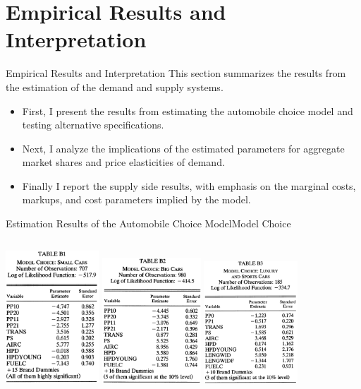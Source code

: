 \documentclass{beamer}
\begin{document}
\section{Empirical Results and Interpretation}
\begin{frame}[shrink]
	\transfade %
	\tableofcontents[sectionstyle=show/shaded,subsectionstyle=show/shaded/hide]
	\addtocounter{framenumber}{-1}
\end{frame}
\begin{frame}{Empirical Results and Interpretation}
	This section summarizes the results from the estimation of the demand and supply systems.
	\begin{itemize}
		\item First, I present the results from estimating the automobile choice model and testing alternative specifications.
		\item Next, I analyze the implications of the estimated parameters for aggregate market shares and price elasticities of demand.
		\item Finally I report the supply side results, with emphasis on the marginal costs, markups, and cost parameters implied by the model.
	\end{itemize}
\end{frame}
\begin{frame}{Estimation Results of the Automobile Choice Model}{Model Choice}
	\begin{columns}
		\includegraphics[width=3.5cm]{table_b1.png}
		\includegraphics[width=3.7cm]{table_b2.png}
		\includegraphics[width=3.5cm]{table_b3.png}
	\end{columns}
\end{frame}
\end{document}
